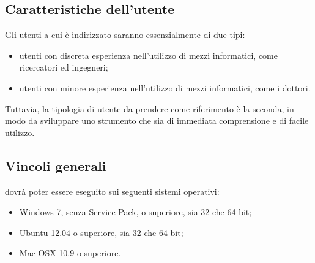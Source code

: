 \subsection{Caratteristiche dell'utente}
Gli utenti a cui è indirizzato \project{} saranno essenzialmente di due tipi:
\begin{itemize}
\item utenti con discreta esperienza nell'utilizzo di mezzi informatici, come ricercatori ed ingegneri;
\item utenti con minore esperienza nell'utilizzo di mezzi informatici, come i dottori.
\end{itemize}
Tuttavia, la tipologia di utente da prendere come riferimento è la seconda, in modo da sviluppare uno strumento che sia di immediata comprensione e di facile utilizzo.

\subsection{Vincoli generali}
\project{} dovrà poter essere eseguito sui seguenti sistemi operativi:
\begin{itemize}
\item Windows\glossario{} 7, senza Service Pack, o superiore, sia 32 che 64 bit;
\item Ubuntu 12.04 o superiore, sia 32 che 64 bit;
\item Mac OSX 10.9 o superiore.
\end{itemize}

